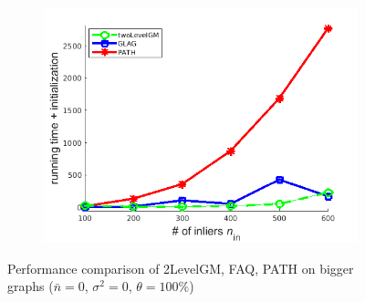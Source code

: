 \begin{figure}[h]
\begin{subfigure}[b]{0.3\textwidth}
			\includegraphics[scale=0.25]{"chapter3/fig/SyntheticTest_BigGraphs/descr/Results_v4.3.3/Test1/time_summary_avg1t"} 
		\end{subfigure} 	
	\caption[Performance comparison of 2LevelGM, FAQ, PATH on bigger graphs: test $1$]{Performance comparison of 2LevelGM, FAQ, PATH on bigger graphs ($\bar{n}=0$, $\sigma^2=0$, $\theta=100\%$)}
	\label{fig:synTest1_bigGraphs_ver433}
\end{figure}
